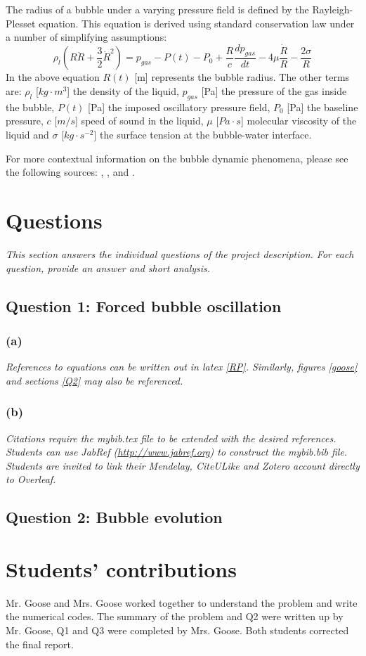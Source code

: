 \documentclass[12pt,twoside,letterpaper]{article}
\begin{document}
The radius of a bubble under a varying pressure field is defined by the Rayleigh-Plesset equation. This equation is derived using standard conservation law under a number of simplifying assumptions:
\begin{equation}
\rho_l \left(R\ddot{R} + \frac{3}{2}\dot{R}^2\right) = p_{gas} -P(t) -P_0 +\frac{R}{c}\frac{d p_{gas}}{dt} - 4\mu \frac{\dot{R}}{R}-\frac{2\sigma}{R}
\label{RP}
\end{equation}
In the above equation $R(t)$ [m] represents the bubble radius. The other terms are: $\rho_l$ [$kg\cdot m^3$]  the density of the liquid, $p_{gas}$ [Pa] the pressure of the gas inside the bubble, $P(t)$ [Pa] the imposed oscillatory pressure field, $P_0$ [Pa] the baseline pressure, $c$ [$m/s$] speed of sound in the liquid, $\mu$ [$Pa\cdot s$] molecular viscosity of the liquid and $\sigma$ [$kg\cdot s^{-2}$] the surface tension at the bubble-water interface.

For more contextual information on the bubble dynamic phenomena, please see the following sources: \cite{Hilgenfeldt1998}, \cite{Kreider2011}, and \cite{Lohse2003}.



\section{Questions}
\emph{This section answers the individual questions of the project description.  For each question, provide an answer and short analysis.}
\subsection*{Question 1: Forced bubble oscillation}
\subsubsection*{(a)} \emph{References to equations can be written out in latex \eqref{RP}. Similarly, figures  \ref{goose} and sections \ref{Q2} may also be referenced.}
\subsubsection*{(b)} \emph{Citations require the mybib.tex file to be extended with the desired references. Students can use JabRef (\url{http://www.jabref.org}) to construct the mybib.bib file. Students are invited to link their Mendelay, CiteULike and Zotero account directly to Overleaf. }

\subsection{Question 2: Bubble evolution \label{Q2}}


\vfill

\section*{Students' contributions}
Mr. Goose and Mrs. Goose worked together to understand the problem and write the numerical codes. The summary of the problem and Q2 were written up by Mr. Goose, Q1 and Q3 were completed by Mrs. Goose. Both students corrected the final report.

\newpage

\end{document}
